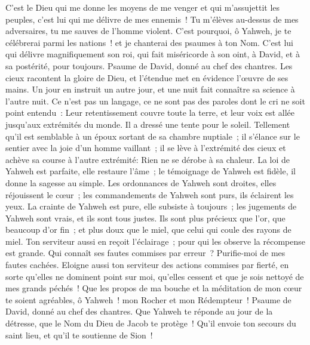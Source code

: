 \begin{multicols}{2}
C'est le Dieu qui me donne les moyens de me venger et qui m'assujettit les peuples,
c'est lui qui me délivre de mes ennemis~! Tu m'élèves au-dessus de mes adversaires, tu me sauves de l'homme violent.
C'est pourquoi, ô Yahweh, je te célébrerai parmi les nations~! et je chanterai des psaumes à ton Nom.
C'est lui qui délivre magnifiquement son roi, qui fait miséricorde à son oint, à David, et à sa postérité, pour toujours.
\VerseOne{}Psaume de David, donné au chef des chantres.
Les cieux racontent la gloire de Dieu, et l'étendue met en évidence l'œuvre de ses mains.
Un jour en instruit un autre jour, et une nuit fait connaître sa science à l'autre nuit.
Ce n'est pas un langage, ce ne sont pas des paroles dont le cri ne soit point entendu~:
Leur retentissement couvre toute la terre, et leur voix est allée jusqu'aux extrémités du monde. Il a dressé une tente pour le soleil.
Tellement qu'il est semblable à un époux sortant de sa chambre nuptiale~; il s'élance sur le sentier avec la joie d'un homme vaillant~;
il se lève à l'extrémité des cieux et achève sa course à l'autre extrémité: Rien ne se dérobe à sa chaleur.
La loi de Yahweh est parfaite, elle restaure l'âme~; le témoignage de Yahweh est fidèle, il donne la sagesse au simple.
Les ordonnances de Yahweh sont droites, elles réjouissent le cœur~; les commandements de Yahweh sont purs, ils éclairent les yeux.
La crainte de Yahweh est pure, elle subsiste à toujours~; les jugements de Yahweh sont vrais, et ils sont tous justes.
Ils sont plus précieux que l'or, que beaucoup d'or fin~; et plus doux que le miel, que celui qui coule des rayons de miel.
Ton serviteur aussi en reçoit l'éclairage~; pour qui les observe la récompense est grande.
Qui connaît ses fautes commises par erreur~? Purifie-moi de mes fautes cachées.
Eloigne aussi ton serviteur des actions commises par fierté, en sorte qu'elles ne dominent point sur moi, qu'elles cessent et que je sois nettoyé de mes grands péchés~!
Que les propos de ma bouche et la méditation de mon cœur te soient agréables, ô Yahweh~! mon Rocher et mon Rédempteur~!
\VerseOne{}Psaume de David, donné au chef des chantres.
Que Yahweh te réponde au jour de la détresse, que le Nom du Dieu de Jacob te protège~!
Qu'il envoie ton secours du saint lieu, et qu'il te soutienne de Sion~!

\end{multicols}
